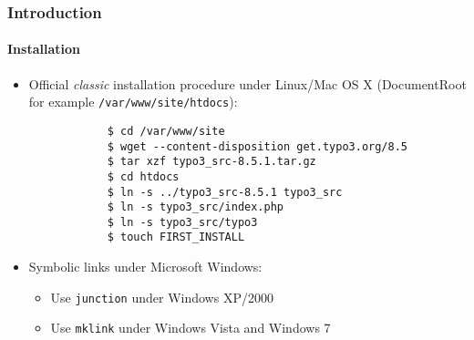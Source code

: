 \begin{frame}[fragile]
	\frametitle{Introduction}
	\framesubtitle{Installation}

	\begin{itemize}
		\item Official \textit{classic} installation procedure under Linux/Mac OS X\newline
			(DocumentRoot for example \texttt{/var/www/site/htdocs}):
		\begin{lstlisting}
			$ cd /var/www/site
			$ wget --content-disposition get.typo3.org/8.5
			$ tar xzf typo3_src-8.5.1.tar.gz
			$ cd htdocs
			$ ln -s ../typo3_src-8.5.1 typo3_src
			$ ln -s typo3_src/index.php
			$ ln -s typo3_src/typo3
			$ touch FIRST_INSTALL
		\end{lstlisting}

		\item Symbolic links under Microsoft Windows:

			\begin{itemize}
				\item Use \texttt{junction} under Windows XP/2000
				\item Use \texttt{mklink} under Windows Vista and Windows 7
			\end{itemize}

	\end{itemize}
\end{frame}

